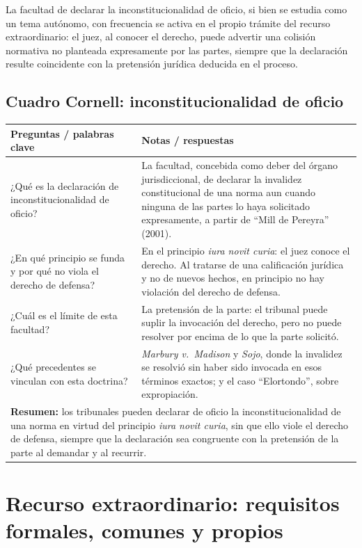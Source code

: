 \documentclass[12pt,oneside]{book}
\begin{document}
La facultad de declarar la inconstitucionalidad de oficio, si bien se estudia
como un tema autónomo, con frecuencia se activa en el propio trámite del recurso
extraordinario: el juez, al conocer el derecho, puede advertir una colisión
normativa no planteada expresamente por las partes, siempre que la declaración
resulte coincidente con la pretensión jurídica deducida en el proceso.

\section{Cuadro Cornell: inconstitucionalidad de oficio}

\begin{longtable}{@{}p{}p{}@{}}
\toprule
\textbf{Preguntas / palabras clave} & \textbf{Notas / respuestas} \\
\midrule
\endhead
¿Qué es la declaración de inconstitucionalidad de oficio? & La facultad,
concebida como deber del órgano jurisdiccional, de declarar la invalidez
constitucional de una norma aun cuando ninguna de las partes lo haya solicitado
expresamente, a partir de ``Mill de Pereyra'' (2001). \\
¿En qué principio se funda y por qué no viola el derecho de defensa? & En el
principio \textit{iura novit curia}: el juez conoce el derecho. Al tratarse de
una calificación jurídica y no de nuevos hechos, en principio no hay violación
del derecho de defensa. \\
¿Cuál es el límite de esta facultad? & La pretensión de la parte: el tribunal
puede suplir la invocación del derecho, pero no puede resolver por encima de lo
que la parte solicitó. \\
¿Qué precedentes se vinculan con esta doctrina? & \textit{Marbury v.\ Madison} y
\textit{Sojo}, donde la invalidez se resolvió sin haber sido invocada en esos
términos exactos; y el caso ``Elortondo'', sobre expropiación. \\
\midrule
\multicolumn{2}{p{0.95\textwidth}}{\textbf{Resumen:} los tribunales pueden
declarar de oficio la inconstitucionalidad de una norma en virtud del principio
\textit{iura novit curia}, sin que ello viole el derecho de defensa, siempre que
la declaración sea congruente con la pretensión de la parte al demandar y al
recurrir.} \\
\bottomrule
\end{longtable}

\chapter{Recurso extraordinario: requisitos formales, comunes y propios}
\label{cap:p8}
\end{document}
